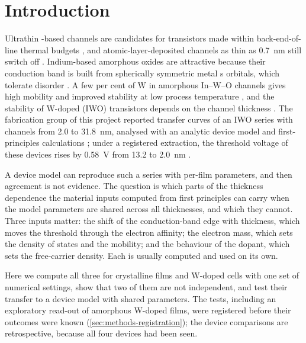 \documentclass[11pt]{article}
\begin{document}
\section{Introduction}
\label{sec:intro}

Ultrathin \InO{}-based channels are candidates for transistors made within back-end-of-line thermal budgets
\citep{Januar2026}, and atomic-layer-deposited \InO{} channels as thin as 0.7~nm still switch off \citep{Si2021}.
Indium-based amorphous oxides are attractive because their conduction band is built from spherically symmetric metal s
orbitals, which tolerate disorder \citep{Nomura2004,Kamiya2010}. A few per cent of W in amorphous In--W--O channels
gives high mobility and improved stability at low process temperature \citep{Kizu2014}, and the stability of W-doped
\InO{} (IWO) transistors depends on the channel thickness \citep{Kim2024}. The fabrication group of this project
reported transfer curves of an IWO series with channels from 2.0 to 31.8~nm, analysed with an analytic device model and
first-principles calculations \citep{Januar2026}; under a registered extraction, the threshold voltage of these devices
rises by 0.58~V from 13.2 to 2.0~nm .

A device model can reproduce such a series with per-film parameters, and then agreement is not evidence. The question is
which parts of the thickness dependence the material inputs computed from first principles can carry when the model
parameters are shared across all thicknesses, and which they cannot. Three inputs matter: the shift of the
conduction-band edge with thickness, which moves the threshold through the electron affinity; the electron mass, which
sets the density of states and the mobility; and the behaviour of the dopant, which sets the free-carrier density.
Each is usually computed and used on its own.

Here we compute all three for crystalline \InO{} films and W-doped cells with one set of numerical settings, show that
two of them are not independent, and test their transfer to a device model with shared parameters. The tests, including
an exploratory read-out of amorphous W-doped films, were registered before their outcomes were known
(\cref{sec:methods-registration}); the device comparisons are retrospective, because all four devices had been seen.
\end{document}
